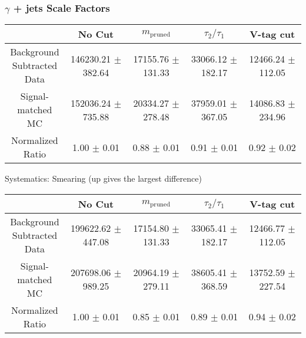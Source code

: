 \documentclass{beamer}
\begin{document}
\begin{frame}
  \frametitle{$\gamma$ + jets Scale Factors}

  \begin{adjustwidth}{-1.5em}{-1.5em}
    {\tiny
      \begin{tabular}{c|c|c|c|c}
        \hline
        & No Cut & $m_\text{pruned}$ & $\tau_2/\tau_1$ & V-tag cut \\
        \hline
        \makecell{Background \\ Subtracted \\ Data} & 146230.21 $\pm$ 382.64 & 17155.76 $\pm$ 131.33 & 33066.12 $\pm$ 182.17 & 12466.24 $\pm$ 112.05 \\
        \makecell{Signal-\\ matched MC} & 152036.24 $\pm$ 735.88 & 20334.27 $\pm$ 278.48 & 37959.01 $\pm$ 367.05 & 14086.83 $\pm$ 234.96 \\
        \hline
        \makecell{Normalized \\ Ratio} & 1.00 $\pm$ 0.01 & 0.88 $\pm$ 0.01 & 0.91 $\pm$ 0.01 & 0.92 $\pm$ 0.02 \\
        \hline
      \end{tabular}
    }
  \end{adjustwidth}

  \vspace{12pt}
  Systematics: Smearing (up gives the largest difference) \\

  \begin{adjustwidth}{-1.5em}{-1.5em}
    {\tiny
      \begin{tabular}{c|c|c|c|c}
        \hline
        & No Cut & $m_\text{pruned}$ & $\tau_2/\tau_1$ & V-tag cut \\
        \hline
        \makecell{Background \\ Subtracted \\ Data} & 199622.62 $\pm$ 447.08 & 17154.80 $\pm$ 131.33 & 33065.41 $\pm$ 182.17 & 12466.77 $\pm$ 112.05 \\
        \makecell{Signal-\\ matched MC} & 207698.06 $\pm$ 989.25 & 20964.19 $\pm$ 279.11 & 38605.41 $\pm$ 368.59 & 13752.59 $\pm$ 227.54 \\
        \hline
        \makecell{Normalized \\ Ratio} & 1.00 $\pm$ 0.01 & 0.85 $\pm$ 0.01 & 0.89 $\pm$ 0.01 & 0.94 $\pm$ 0.02 \\
        \hline
      \end{tabular}
    }
  \end{adjustwidth}

\end{frame}
\end{document}
